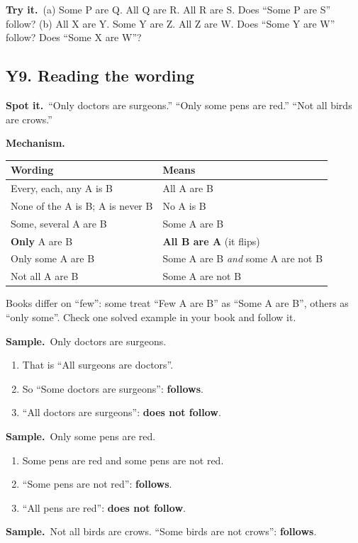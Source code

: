 \documentclass[11pt,a4paper]{article}
\let\oldsubsection\subsection
\renewcommand{\subsection}{\needspace{9\baselineskip}\oldsubsection}
\newcommand{\spot}{\textbf{\color{ember}Spot it.}\ }
\newcommand{\mech}{\textbf{\color{ember}Mechanism.}\ }
\newif\ifkeepsamp
\newcommand{\samp}{\ifkeepsamp\needspace{4\baselineskip}\fi\textbf{\color{ember}Sample.}\ }
\newcommand{\tryit}[1]{\textbf{\color{ember}Try it.}\ #1}
\begin{document}
\tryit (a) Some P are Q. All Q are R. All R are S. Does ``Some P are S'' follow? (b) All X are Y. Some Y are Z. All Z are W. Does ``Some Y are W'' follow? Does ``Some X are W''?

\subsection{Y9. Reading the wording}
\spot ``Only doctors are surgeons.'' ``Only some pens are red.'' ``Not all birds are crows.''

\mech
\begin{center}\small\renewcommand{\arraystretch}{1.18}\setlength{\tabcolsep}{9pt}
\begin{tabularx}{\linewidth}{@{}>{\raggedright\arraybackslash}X >{\raggedright\arraybackslash}X@{}}
\toprule
\textbf{\color{slate}Wording} & \textbf{\color{slate}Means} \\ \midrule
Every, each, any A is B & All A are B \\
None of the A is B; A is never B & No A is B \\
Some, several A are B & Some A are B \\
\textbf{Only} A are B & \textbf{All B are A} (it flips) \\
Only some A are B & Some A are B \emph{and} some A are not B \\
Not all A are B & Some A are not B \\
\bottomrule
\end{tabularx}\end{center}
Books differ on ``few'': some treat ``Few A are B'' as ``Some A are B'', others as ``only some''. Check one solved example in your book and follow it.

\samp Only doctors are surgeons.
\begin{enumerate}
\item That is ``All surgeons are doctors''.
\item So ``Some doctors are surgeons'': \textbf{follows}.
\item ``All doctors are surgeons'': \textbf{does not follow}.
\end{enumerate}
\samp Only some pens are red.
\begin{enumerate}
\item Some pens are red and some pens are not red.
\item ``Some pens are not red'': \textbf{follows}.
\item ``All pens are red'': \textbf{does not follow}.
\end{enumerate}
\samp Not all birds are crows. ``Some birds are not crows'': \textbf{follows}.
\end{document}
